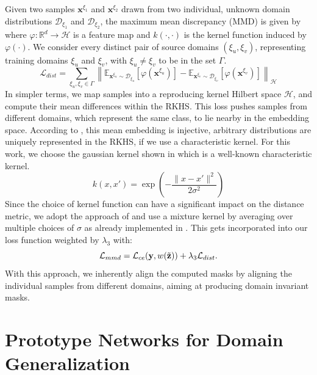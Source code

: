 Given two samples $\mathbf{x}^{\xi_1}$ and $\mathbf{x}^{\xi_2}$ drawn from two individual, unknown  domain distributions $\mathcal{D}_{\xi_1}$ and $\mathcal{D}_{\xi_2}$, the maximum mean discrepancy (MMD) is given by  where $\varphi: \mathbb{R}^{d} \rightarrow \mathcal{H}$ is a feature map and $k(\cdot, \cdot)$ is the kernel function induced by $\varphi(\cdot)$. We consider every distinct pair of source domains $(\xi_u, \xi_v)$, representing training domains $\xi_u$ and $\xi_v$, with $\xi_u\neq \xi_v$ to be in the set $\Gamma$.
\begin{equation}
\label{eq:mmd_maps}
    \mathcal{L}_{dist} =\sum_{\xi_u,\xi_v \in \Gamma}\left\|\mathbb{E}_{\mathbf{x}^{\xi_u} \sim \mathcal{D}_{\xi_u}}[\varphi(\mathbf{x}^{\xi_u})]-\mathbb{E}_{\mathbf{x}^{\xi_v} \sim \mathcal{D}_{\xi_v}}[\varphi(\mathbf{x}^{\xi_v})]\right\|_{\mathcal{H}}
\end{equation}
In simpler terms, we map samples into a reproducing kernel Hilbert space $\mathcal{H}$, and compute their mean differences within the RKHS. This loss pushes samples from different domains, which represent the same class, to lie nearby in the embedding space. According to \citet{SriperumbudurFGLS09}, this mean embedding is injective, \ie arbitrary distributions are uniquely represented in the RKHS, if we use a characteristic kernel. For this work, we choose the gaussian kernel shown in  which is a well-known characteristic kernel.
\begin{equation}
\label{eq:gaussian_kernel}
    k(x,x') = \exp \left(-\frac{\|x-x'\|^{2}}{2 \sigma^{2}}\right)
\end{equation}
Since the choice of kernel function can have a significant impact on the distance metric, we adopt the approach of \citet{LiPWK18} and use a mixture kernel by averaging over multiple choices of $\sigma$ as already implemented in \domainbed. This gets incorporated into our loss function weighted by $\lambda_3$ with:
\begin{equation}
    \mathcal{L}_{mmd} = \mathcal{L}_{ce}(\mathbf{y}, w(\Tilde{\mathbf{z}}))+\lambda_3 \mathcal{L}_{dist}.
\end{equation}
With this approach, we inherently align the computed masks by aligning the individual samples from different domains, aiming at producing domain invariant masks. 

\section{Prototype Networks for Domain Generalization}
\label{sec:prototype_networks}

